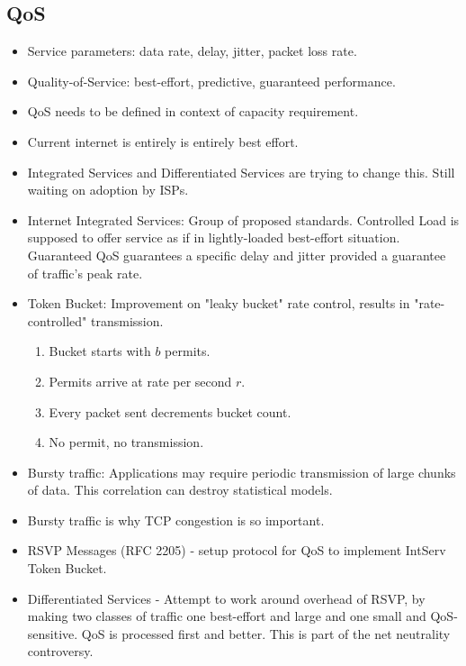 \documentclass{scrartcl}
\begin{document}
\subsection*{QoS}
\begin{itemize}
\item Service parameters: data rate, delay, jitter, packet loss rate.
\item Quality-of-Service: best-effort, predictive, guaranteed performance.
\item QoS needs to be defined in context of capacity requirement.
\item Current internet is entirely is entirely best effort.
\item Integrated Services and Differentiated Services are trying to
change this. Still waiting on adoption by ISPs.
\item Internet Integrated Services: Group of proposed standards.
Controlled Load is supposed to offer service as if in lightly-loaded
best-effort situation. Guaranteed QoS guarantees a specific delay
and jitter provided a guarantee of traffic's peak rate.
\item Token Bucket: Improvement on "leaky bucket" rate control,
results in "rate-controlled" transmission.
\begin{enumerate}
\item Bucket starts with $b$ permits.
\item Permits arrive at rate per second $r$.
\item Every packet sent decrements bucket count.
\item No permit, no transmission.
\end{enumerate}
\item Bursty traffic: Applications may require periodic transmission
of large chunks of data. This correlation can destroy statistical models.
\item Bursty traffic is why TCP congestion is so important.
\item RSVP Messages (RFC 2205) - setup protocol for QoS to implement
IntServ Token Bucket.
\item Differentiated Services - Attempt to work around overhead of RSVP,
by making two classes of traffic one best-effort and large and one small and 
QoS-sensitive. QoS is processed first and better. This is part of the net
neutrality controversy.
\end{itemize}
\end{document}
